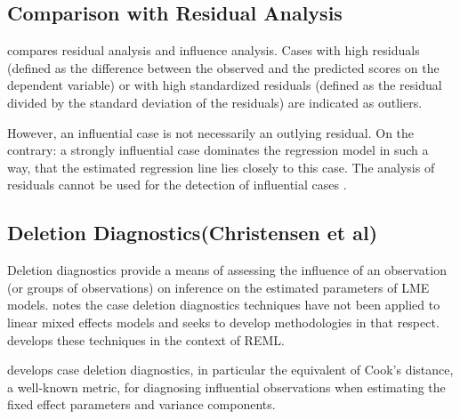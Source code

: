 \documentclass[12pt, a4paper]{report}
\theoremstyle{plain}
\theoremstyle{definition}
\theoremstyle{remark}
\begin{document}
\subsection{Comparison with Residual Analysis}

\citet{influenceLME4} compares residual analysis and influence analysis. Cases with high residuals (defined as the difference between the observed and the predicted scores on the dependent
variable) or with high standardized residuals (defined as the residual divided by the standard deviation
of the residuals) are indicated as outliers.

However, an influential case is not necessarily an outlying residual. On the contrary: a strongly influential case dominates
the regression model in such a way, that the estimated regression line lies closely to this case. The analysis of residuals cannot be used for the detection of influential cases \citep{crawley2012r}.

\subsection{Deletion Diagnostics(Christensen et al)}
Deletion diagnostics provide a means of assessing the influence of an observation (or groups of observations) on inference on the estimated parameters of LME models.
\citet{Christensen} notes the case deletion diagnostics techniques have not been applied to linear mixed effects models and seeks to develop methodologies in that respect. \citet{Christensen} develops these techniques in the context of REML.
		
\citet{Christensen} develops  case deletion diagnostics, in particular the equivalent of  Cook's distance, a well-known metric, for diagnosing influential observations when estimating the fixed effect parameters and variance components. 
	
%	
\end{document}
